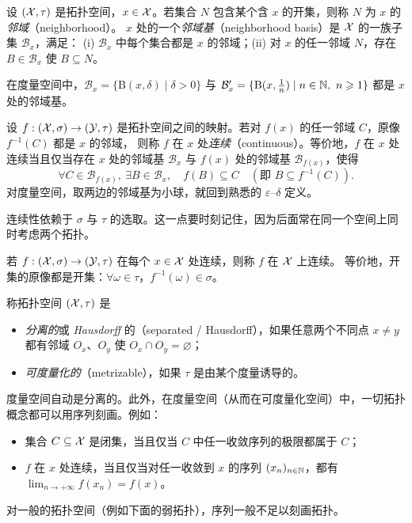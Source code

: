 \begin{definition}[邻域]
\label{def:29}
设 $(\mathcal{X},\tau)$ 是拓扑空间，$x\in\mathcal{X}$。若集合 $N$ 包含某个含 $x$ 的开集，则称 $N$ 为 $x$ 的\emph{邻域}（neighborhood）。
$x$ 处的一个\emph{邻域基}（neighborhood basis）是 $\mathcal{X}$ 的一族子集 $\mathcal{B}_x$，满足：
(i) $\mathcal{B}_x$ 中每个集合都是 $x$ 的邻域；(ii) 对 $x$ 的任一邻域 $N$，存在 $B\in\mathcal{B}_x$ 使 $B\subseteq N$。
\end{definition}

\begin{example}
\label{exa:27}
在度量空间中，$\mathcal{B}_x=\{\mathrm{B}(x,\delta)\mid\delta>0\}$ 与 $\mathcal{B}'_x=\{\mathrm{B}(x,\tfrac1n)\mid n\in\mathbb{N},\ n\geqslant 1\}$
都是 $x$ 处的邻域基。
\end{example}

\begin{definition}[一点处连续]
\label{def:30}
设 $f:(\mathcal{X},\sigma)\to(\mathcal{Y},\tau)$ 是拓扑空间之间的映射。若对 $f(x)$ 的任一邻域 $C$，原像 $f^{-1}(C)$ 都是 $x$ 的邻域，
则称 $f$ 在 $x$ 处\emph{连续}（continuous）。等价地，$f$ 在 $x$ 处连续当且仅当存在 $x$ 处的邻域基 $\mathcal{B}_x$
与 $f(x)$ 处的邻域基 $\mathcal{B}_{f(x)}$，使得
\[
  \forall C\in\mathcal{B}_{f(x)},\ \exists B\in\mathcal{B}_x,\quad f(B)\subseteq C\quad(\text{即 } B\subseteq f^{-1}(C)).
\]
对度量空间，取两边的邻域基为小球，就回到熟悉的 $\varepsilon$--$\delta$ 定义。
\end{definition}

连续性依赖于 $\sigma$ 与 $\tau$ 的选取。这一点要时刻记住，因为后面常在同一个空间上同时考虑两个拓扑。

\begin{definition}[连续]
\label{def:31}
若 $f:(\mathcal{X},\sigma)\to(\mathcal{Y},\tau)$ 在每个 $x\in\mathcal{X}$ 处连续，则称 $f$ 在 $\mathcal{X}$ 上连续。
等价地，开集的原像都是开集：$\forall\omega\in\tau$，$f^{-1}(\omega)\in\sigma$。
\end{definition}

\begin{definition}
\label{def:32}
称拓扑空间 $(\mathcal{X},\tau)$ 是
\begin{itemize}
  \item \emph{分离的}或 \emph{Hausdorff} 的（separated / Hausdorff），如果任意两个不同点 $x\neq y$ 都有邻域 $O_x$、$O_y$ 使 $O_x\cap O_y=\varnothing$；
  \item \emph{可度量化的}（metrizable），如果 $\tau$ 是由某个度量诱导的。
\end{itemize}
\end{definition}

\begin{remark}
\label{rem:24}
度量空间自动是分离的。此外，在度量空间（从而在可度量化空间）中，一切拓扑概念都可以用序列刻画。例如：
\begin{itemize}
  \item 集合 $C\subseteq\mathcal{X}$ 是闭集，当且仅当 $C$ 中任一收敛序列的极限都属于 $C$；
  \item $f$ 在 $x$ 处连续，当且仅当对任一收敛到 $x$ 的序列 $(x_n)_{n\in\mathbb{N}}$，都有 $\lim_{n\to+\infty}f(x_n)=f(x)$。
\end{itemize}
对一般的拓扑空间（例如下面的弱拓扑），序列一般不足以刻画拓扑。
\end{remark}

